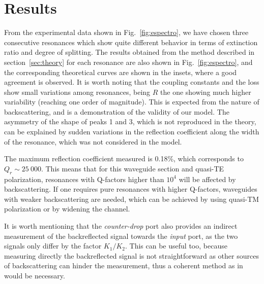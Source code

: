 \documentclass[10pt,letterpaper]{article}
\begin{document}

\section{Results}

From the experimental data shown in Fig.~\ref{fig:espectro}, we have chosen three consecutive resonances which show quite different behavior in terms of extinction ratio and degree of splitting. The results obtained from the method described in section~\ref{sec:theory} for each resonance are also shown in Fig.~\ref{fig:espectro}, and the corresponding theoretical curves are shown in the insets, where a good agreement is observed. It is worth noting that the coupling constants and the loss show small variations among resonances, being $R$ the one showing much higher variability (reaching one order of magnitude). This is expected from the nature of backscattering, and is a demonstration of the validity of our model. The asymmetry of the shape of peaks 1 and 3, which is not reproduced in the theory, can be explained by sudden variations in the reflection coefficient along the width of the resonance, which was not considered in the model.

The maximum reflection coefficient measured is 0.18\%, which corresponds to $Q_r \sim 25~000$. This means that for this waveguide section and quasi-TE polarization, resonances with Q-factors higher than $10^4$ will be affected by backscattering. If one requires pure resonances with higher Q-factors, waveguides with weaker backscattering are needed, which can be achieved by using quasi-TM polarization or by widening the channel.\cite{Morichetti2010b}

It is worth mentioning that the \emph{counter-drop} port also provides an indirect measurement of the backreflected signal towards the \emph{input} port, as the two signals only differ by the factor $K_1/K_2$. This can be useful too, because measuring directly the backreflected signal is not straightforward as other sources of backscattering can hinder the measurement, thus a coherent method as in \cite{Morichetti2010a} would be necessary.



\end{document}
